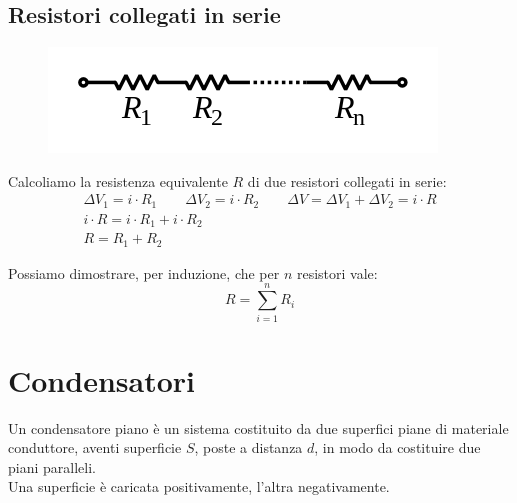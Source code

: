 \subsection{Resistori collegati in serie}
\begin{figure}[h!]
	\centering
    \includegraphics[scale=0.5]{resistori-serie}
\end{figure}
Calcoliamo la resistenza equivalente $R$ di due resistori collegati in serie:
\begin{displaymath}\begin{aligned}
	\Delta V_1 = i \cdot R_1 \qquad \Delta V_2 = i \cdot R_2 \qquad \Delta V = \Delta V_1 + \Delta V_2 = i \cdot R \\ 
    i \cdot R = i \cdot R_1 + i\cdot R_2\\
    R = R_1 + R_2
\end{aligned}\end{displaymath}

Possiamo dimostrare, per induzione, che per $n$ resistori vale:
\begin{displaymath}
	R = \sum_{i=1}^n R_i
\end{displaymath}

\section{Condensatori}
Un condensatore piano è un sistema costituito da due superfici piane di materiale conduttore, aventi superficie $S$, poste a distanza $d$, in modo da costituire due piani paralleli.\\
Una superficie è caricata positivamente, l'altra negativamente.


